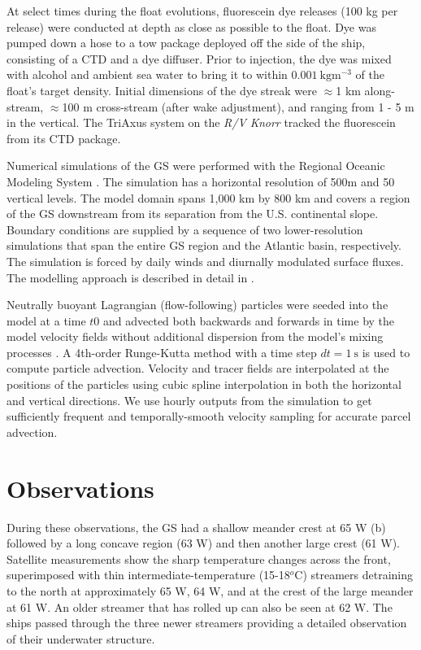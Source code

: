 \documentclass[draft,grl]{agutex2015}
\begin{document}
\begin{article}
At select times during the float evolutions, fluorescein dye releases (100 kg per release) were conducted at depth as close as possible to the float.  Dye was pumped down a hose to a tow package deployed off the side of the ship, consisting of a CTD and a dye diffuser.  Prior to injection, the dye was mixed with alcohol and ambient sea water to bring it to within $0.001\ \mathrm{kg m^{-3}}$ of the float's target density. Initial dimensions of the dye streak were $\approx$1 km along-stream, $\approx$100 m cross-stream (after wake adjustment), and ranging from 1 - 5 m in the vertical. The TriAxus system on the \emph{R/V Knorr} tracked the fluorescein from its CTD package.  

Numerical simulations of the GS were performed with the Regional Oceanic Modeling System \citep[ROMS][]{shchepetkinmcwilliams05}. The simulation has a horizontal resolution of 500m and 50 vertical levels. The model domain spans 1,000 km by 800 km and covers a region of the GS downstream from its separation from the U.S. continental slope. Boundary conditions are supplied by a sequence of two lower-resolution simulations that span the entire GS region and the Atlantic basin, respectively. The simulation is forced by daily winds and diurnally modulated surface fluxes. The modelling approach is described in detail in \citet{gulaetal15}.

Neutrally buoyant Lagrangian (flow-following) particles were seeded into the model at a time $t0$ and advected both backwards and forwards in time by the model velocity fields without additional dispersion from the model's mixing processes \citep{gulaetal14}. A 4th-order Runge-Kutta method with a  time step  $dt = 1\ \mathrm{s}$ is used to compute particle advection. Velocity and tracer fields are interpolated at the positions of the particles using cubic spline interpolation in both the horizontal and vertical directions.  We use hourly outputs from the simulation to get sufficiently frequent and temporally-smooth velocity sampling for accurate parcel advection.


\section{Observations}

During these observations, the GS had a shallow meander crest at 65 W (b)  followed by a long concave region (63 W) and then another large  crest (61 W).  Satellite measurements show the sharp temperature changes across the front, superimposed with thin intermediate-temperature (15-18$^o$C) streamers detraining to the north at approximately 65 W, 64 W, and at the crest of the large meander at 61 W.  An older streamer that has rolled up can also be seen at 62 W.  The ships passed through the three newer streamers providing a detailed observation of their underwater structure.  


\end{article}
\end{document}
